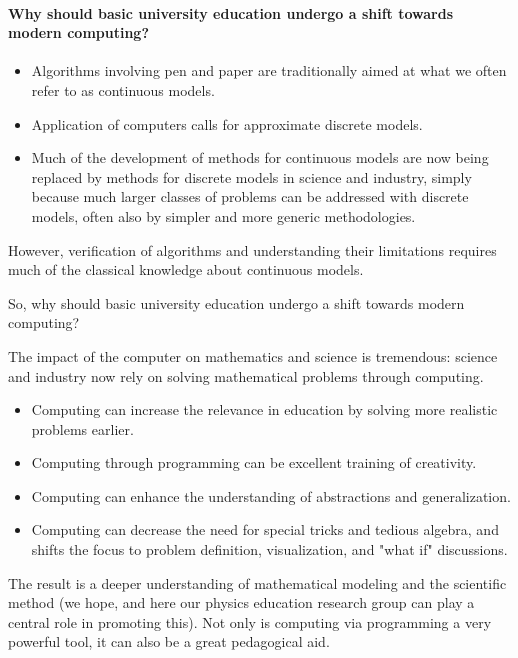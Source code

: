 \documentclass[%
oneside,                 %
final,                   %
10pt]{article}
\begin{document}
\paragraph{Why should basic university education undergo a shift towards modern computing?}
\begin{itemize}
\item Algorithms involving pen and paper are traditionally aimed at what we often refer to as continuous models.

\item Application of computers calls for approximate discrete models.

\item Much of the development of methods for continuous models are now being replaced by methods  for discrete models in science and industry, simply because much larger classes of problems can be addressed with discrete models, often also by simpler and more generic methodologies.
\end{itemize}

\noindent
However, verification of algorithms and understanding their limitations requires much of the classical knowledge about continuous models.

So, why should basic university education undergo a shift towards modern computing?

The impact of the computer on mathematics and science is tremendous: science and industry now rely on solving mathematical problems through computing.
\begin{itemize}
\item Computing can increase the relevance in education by solving more realistic problems earlier.

\item Computing through programming can be excellent training of creativity.

\item Computing can enhance the understanding of abstractions and generalization.

\item Computing can decrease the need for special tricks and tedious algebra, and shifts the focus to problem definition, visualization, and "what if" discussions.
\end{itemize}

\noindent
The result is a deeper understanding of mathematical modeling and the scientific method (we hope, and here our physics education research group can play a central role in promoting this).
Not only is computing via programming a very powerful tool, it can also be a great pedagogical aid.
\end{document}
